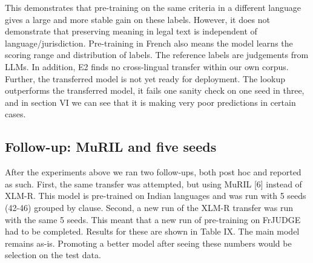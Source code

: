 \documentclass[conference]{IEEEtran}
\begin{document}
This demonstrates that pre-training on the same criteria in a different language gives a large and more stable gain on these labels. However, it does not demonstrate that preserving meaning in legal text is independent of language/jurisdiction. Pre-training in French also means the model learns the scoring range and distribution of labels. The reference labels are judgements from LLMs. In addition, E2 finds no cross-lingual transfer within our own corpus. Further, the transferred model is not yet ready for deployment. The lookup outperforms the transferred model, it fails one sanity check on one seed in three, and in section VI we can see that it is making very poor predictions in certain cases.

\subsection{Follow-up: MuRIL and five seeds}

After the experiments above we ran two follow-ups, both post hoc and reported as such. First, the same transfer was attempted, but using MuRIL [6] instead of XLM-R. This model is pre-trained on Indian languages and was run with 5 seeds (42-46) grouped by clause. Second, a new run of the XLM-R transfer was run with the same 5 seeds. This meant that a new run of pre-training on FrJUDGE had to be completed. Results for these are shown in Table IX. The main model remains as-is. Promoting a better model after seeing these numbers would be selection on the test data.
\end{document}
